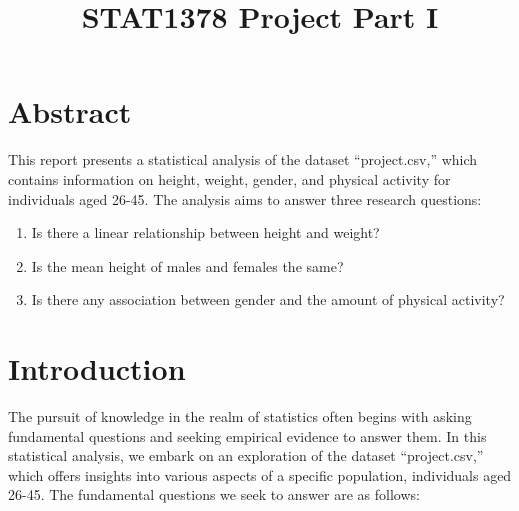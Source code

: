 \documentclass[
]{article}
\title{STAT1378 Project Part I}
\author{}
\date{\vspace{-2.5em}}
\providecommand{\tightlist}{%
  \setlength{\itemsep}{0pt}\setlength{\parskip}{0pt}}
\begin{document}
\maketitle

{
\setcounter{tocdepth}{2}
\tableofcontents
}
\hypertarget{abstract}{%
\section{Abstract}\label{abstract}}

This report presents a statistical analysis of the dataset ``project.csv,'' which contains information on height, weight, gender, and physical activity for individuals aged 26-45. The analysis aims to answer three research questions:

\begin{enumerate}
\def\labelenumi{\arabic{enumi}.}
\tightlist
\item
  Is there a linear relationship between height and weight?
\item
  Is the mean height of males and females the same?
\item
  Is there any association between gender and the amount of physical activity?
\end{enumerate}

\newpage

\hypertarget{introduction}{%
\section{Introduction}\label{introduction}}

The pursuit of knowledge in the realm of statistics often begins with asking fundamental questions and seeking empirical evidence to answer them. In this statistical analysis, we embark on an exploration of the dataset ``project.csv,'' which offers insights into various aspects of a specific population, individuals aged 26-45. The fundamental questions we seek to answer are as follows:
\end{document}
